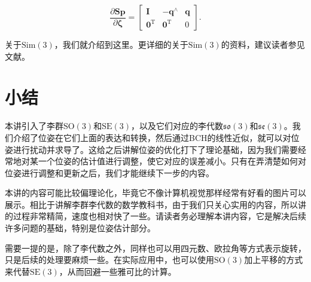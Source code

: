 \begin{equation}
\frac{{\partial \bm{Sp}}}{{\partial \boldsymbol{\zeta} }} = \left[ {\begin{array}{*{20}{c}}
	\bm{I} &{ - {\bm{q}^ \wedge }}& \bm{q} \\
	{{\bm{0}^\mathrm{T}}} & {{ \bm{0}^\mathrm{T}}}&0
	\end{array}} \right].
\end{equation}

关于$\mathrm{Sim}(3)$，我们就介绍到这里。更详细的关于$\mathrm{Sim}(3)$的资料，建议读者参见文献\cite{Strasdat2012a}。


\section{小结}
本讲引入了李群$\mathrm{SO}(3)$和$\mathrm{SE}(3)$，以及它们对应的李代数$\mathfrak{so}(3)$和$\mathfrak{se}(3)$。我们介绍了位姿在它们上面的表达和转换，然后通过BCH的线性近似，就可以对位姿进行扰动并求导了。这给之后讲解位姿的优化打下了理论基础，因为我们需要经常地对某一个位姿的估计值进行调整，使它对应的误差减小。只有在弄清楚如何对位姿进行调整和更新之后，我们才能继续下一步的内容。

本讲的内容可能比较偏理论化，毕竟它不像计算机视觉那样经常有好看的图片可以展示。相比于讲解李群李代数的数学教科书，由于我们只关心实用的内容，所以讲的过程非常精简，速度也相对快了一些。请读者务必理解本讲内容，它是解决后续许多问题的基础，特别是位姿估计部分。

需要一提的是，除了李代数之外，同样也可以用四元数、欧拉角等方式表示旋转，只是后续的处理要麻烦一些。在实际应用中，也可以使用$\mathrm{SO}(3)$加上平移的方式来代替$\mathrm{SE}(3)$，从而回避一些雅可比的计算。

